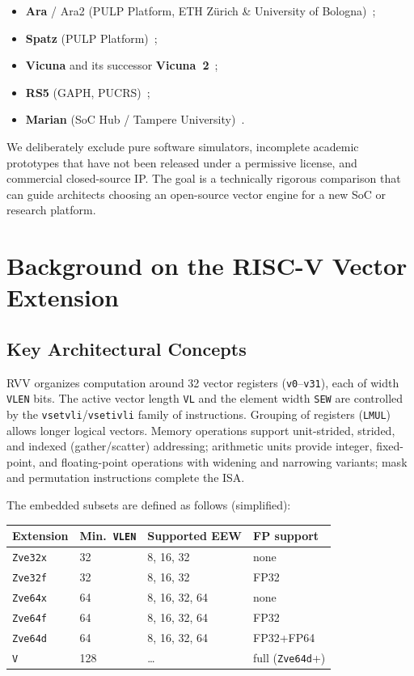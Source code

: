 \documentclass[11pt,a4paper]{article}
\begin{document}
\begin{itemize}[leftmargin=*]
  \item \textbf{Ara} / Ara2 (PULP Platform, ETH Z\"urich \& University of Bologna)~\cite{ara2020,ara2-2024};
  \item \textbf{Spatz} (PULP Platform)~\cite{spatz2023};
  \item \textbf{Vicuna} and its successor \textbf{Vicuna~2}~\cite{vicuna,vicuna2};
  \item \textbf{RS5} (GAPH, PUCRS)~\cite{rs5};
  \item \textbf{Marian} (SoC Hub / Tampere University)~\cite{marian2024}.
\end{itemize}

We deliberately exclude pure software simulators, incomplete academic prototypes that have not been released under a permissive license, and commercial closed-source IP. The goal is a technically rigorous comparison that can guide architects choosing an open-source vector engine for a new SoC or research platform.

\section{Background on the RISC-V Vector Extension}

\subsection{Key Architectural Concepts}

RVV organizes computation around 32 vector registers (\texttt{v0}--\texttt{v31}), each of width \texttt{VLEN} bits. The active vector length \texttt{VL} and the element width \texttt{SEW} are controlled by the \texttt{vsetvli}/\texttt{vsetivli} family of instructions. Grouping of registers (\texttt{LMUL}) allows longer logical vectors. Memory operations support unit-strided, strided, and indexed (gather/scatter) addressing; arithmetic units provide integer, fixed-point, and floating-point operations with widening and narrowing variants; mask and permutation instructions complete the ISA.

The embedded subsets are defined as follows (simplified):

\begin{center}
\begin{tabular}{@{}llll@{}}
\toprule
Extension & Min.\ \texttt{VLEN} & Supported EEW & FP support \\
\midrule
\texttt{Zve32x} & 32 & 8, 16, 32 & none \\
\texttt{Zve32f} & 32 & 8, 16, 32 & FP32 \\
\texttt{Zve64x} & 64 & 8, 16, 32, 64 & none \\
\texttt{Zve64f} & 64 & 8, 16, 32, 64 & FP32 \\
\texttt{Zve64d} & 64 & 8, 16, 32, 64 & FP32+FP64 \\
\texttt{V}      & 128 & \ldots & full (\texttt{Zve64d}+) \\
\bottomrule
\end{tabular}
\end{center}
\end{document}
